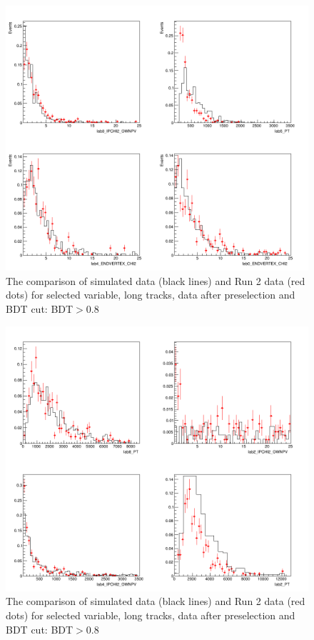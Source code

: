 \begin{figure}[ht]
\includegraphics[width=11.5cm]{figs/MC_Data_Comp/LL8_0.png}
\centering
\caption{The comparison of simulated data (black lines) and Run 2 data (red dots) for selected variable, long tracks, data after preselection and BDT cut: BDT$>$0.8}
\label{fig:MC_Data_Comp_LL2_0}
\end{figure}


\begin{figure}[hb]
\includegraphics[width=11.5cm]{figs/MC_Data_Comp/LL8_1.png}
\centering
\caption{The comparison of simulated data (black lines) and Run 2 data (red dots) for selected variable, long tracks, data after preselection and BDT cut: BDT$>$0.8}
\label{fig:MC_Data_Comp_LL2_1}
\end{figure}

\newpage
